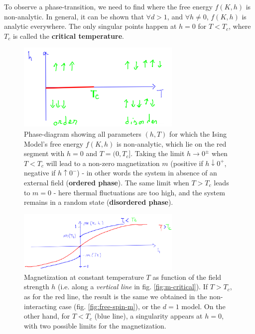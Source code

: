 \documentclass[../template.tex]{subfiles}
\begin{document}
To observe a phase-transition, we need to find where the free energy $f(K,h)$ is non-analytic. In general, it can be shown that $\forall d > 1$, and $\forall h \neq 0$, $f(K,h)$ is analytic everywhere. The only singular points happen at $h=0$ for $T < T_c$, where $T_c$ is called the \textbf{critical temperature}. 

\begin{figure}[H]
    \centering
    \includegraphics[width=0.7\textwidth]{image018.png} 
    \caption{Phase-diagram showing all parameters $(h,T)$ for which the Ising Model's free energy $f(K,h)$ is non-analytic, which lie on the red segment with $h=0$ and $T=(0,T_c]$. Taking the limit $h \to 0^\pm$ when $T < T_c$ will lead to a non-zero magnetization $m$ (positive if $h \downarrow 0^+$, negative if $h \uparrow 0^-$) - in other words the system  in absence of an external field (\textbf{ordered phase}). The same limit when $T > T_c$ leads to $m = 0$ - here thermal fluctuations are too high, and the system remains in a random state (\textbf{disordered phase}).\label{fig:non-analytic}}
\end{figure}

\begin{figure}[H]
    \centering
    \includegraphics[width=0.7\textwidth]{image019.png}
    \caption{Magnetization at constant temperature $T$ as function of the field strength $h$ (i.e. along a \textit{vertical line} in fig. \ref{fig:m-critical}). If $T > T_c$, as for the red line, the result is the same we obtained in the non-interacting case (fig. \ref{fig:free-spin-m}), or the $d=1$ model. On the other hand, for $T < T_c$ (blue line), a singularity appears at $h=0$, with two possible limits for the magnetization.\label{fig:m-plot}}
\end{figure}
\end{document}
